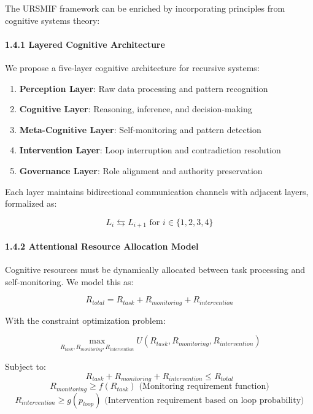 \documentclass[
]{article}
\providecommand{\tightlist}{%
  \setlength{\itemsep}{0pt}\setlength{\parskip}{0pt}}
\begin{document}
The URSMIF framework can be enriched by incorporating principles from
cognitive systems theory:

\paragraph{1.4.1 Layered Cognitive
Architecture}\label{layered-cognitive-architecture}

We propose a five-layer cognitive architecture for recursive systems:

\begin{enumerate}
\def\labelenumi{\arabic{enumi}.}
\tightlist
\item
  \textbf{Perception Layer}: Raw data processing and pattern recognition
\item
  \textbf{Cognitive Layer}: Reasoning, inference, and decision-making
\item
  \textbf{Meta-Cognitive Layer}: Self-monitoring and pattern detection
\item
  \textbf{Intervention Layer}: Loop interruption and contradiction
  resolution
\item
  \textbf{Governance Layer}: Role alignment and authority preservation
\end{enumerate}

Each layer maintains bidirectional communication channels with adjacent
layers, formalized as:

\[L_i \leftrightarrows L_{i+1} \text{ for } i \in \{1,2,3,4\}\]

\paragraph{1.4.2 Attentional Resource Allocation
Model}\label{attentional-resource-allocation-model}

Cognitive resources must be dynamically allocated between task
processing and self-monitoring. We model this as:

\[R_{total} = R_{task} + R_{monitoring} + R_{intervention}\]

With the constraint optimization problem:

\[\max_{R_{task}, R_{monitoring}, R_{intervention}} U(R_{task}, R_{monitoring}, R_{intervention})\]

Subject to:
\[R_{task} + R_{monitoring} + R_{intervention} \leq R_{total}\]
\[R_{monitoring} \geq f(R_{task}) \text{ (Monitoring requirement function)}\]
\[R_{intervention} \geq g(p_{loop}) \text{ (Intervention requirement based on loop probability)}\]
\end{document}
